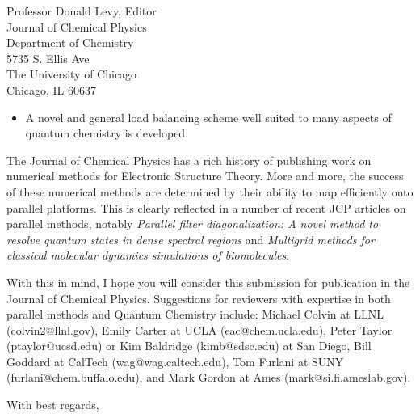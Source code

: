 \begin{letter}{
Professor Donald Levy, Editor\\
Journal of Chemical Physics\\
Department of Chemistry\\
5735 S. Ellis Ave\\
The University of Chicago\\
Chicago, IL 60637}
\begin{itemize}
\item A novel and general load balancing scheme  well suited to many aspects of quantum chemistry is developed.
\end{itemize}

The Journal of Chemical Physics has a rich history of publishing work on numerical methods for 
Electronic Structure Theory.  More and more, the success of these numerical methods are
determined by their ability to map efficiently onto parallel platforms.  This
is clearly reflected in a number of recent JCP articles on parallel methods, notably 
{\em Parallel filter diagonalization: A novel method to resolve quantum states in dense spectral regions} and
{\em Multigrid methods for classical molecular dynamics simulations of biomolecules}.  

With this in mind, I hope you will consider this submission for publication in the Journal of Chemical Physics.
Suggestions for reviewers with expertise in both parallel methods and Quantum Chemistry include:
Michael Colvin at LLNL (colvin2@llnl.gov), Emily Carter at UCLA (eac@chem.ucla.edu),
Peter Taylor (ptaylor@ucsd.edu) or Kim Baldridge (kimb@sdsc.edu) at San Diego,
Bill Goddard at CalTech (wag@wag.caltech.edu), Tom Furlani at SUNY (furlani@chem.buffalo.edu), 
and Mark Gordon at Ames (mark@si.fi.ameslab.gov).  


\closing{With best regards,}
\end{letter}


